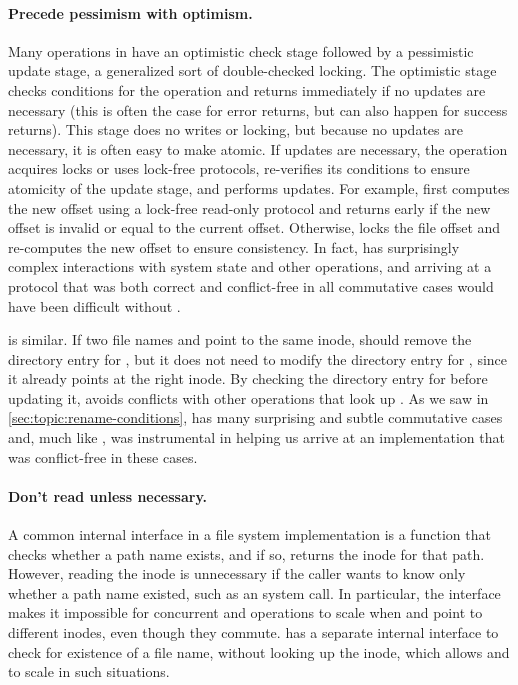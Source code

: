 \paragraph{Precede pessimism with optimism.} Many operations
in \fs have an optimistic check stage followed by a pessimistic update
stage, a generalized sort of double-checked locking.  The optimistic
stage checks conditions for the operation and returns immediately if
no updates are necessary (this is often the case for error returns,
but can also happen for success returns).  This stage does no writes
or locking, but because no updates are necessary, it is often easy to
make atomic.  If updates are necessary, the operation acquires
locks or uses lock-free protocols, re-verifies its conditions to
ensure atomicity of the update stage, and performs updates.  For
example,  first computes the new offset using a lock-free
read-only protocol and returns early if the new offset is invalid or
equal to the current offset.  Otherwise,  locks the file
offset and re-computes the new offset to ensure consistency.
%
In fact,  has surprisingly complex interactions with
system state and other operations, and arriving at a protocol that was
both correct and conflict-free in all commutative cases would have
been difficult without \tool.

 is similar.  If two file names  and 
point to the
same inode,  should remove the directory entry for
, but it does not need to modify the directory entry for
, since
it already points at the right inode.  By checking the directory
entry for  before updating it,  avoids
conflicts with other operations that look up .
%
As we saw in \cref{sec:topic:rename-conditions},  has
many surprising and subtle commutative cases and, much like
, \tool was instrumental in helping us arrive at an
implementation that was conflict-free in these cases.


\paragraph{Don't read unless necessary.}  A common internal interface
in a file system implementation is a  function that
checks whether a path name exists, and if so, returns the inode for
that path.
%
However, reading the inode is unnecessary
if the caller wants to know only whether a path name existed, such as
an  system call.  In particular, the 
interface makes it impossible for concurrent 
and  operations to scale when  and 
point to different inodes, even though they commute.
\fs has a separate internal interface to check for existence of a
file name, without looking up the inode, which allows 
and  to scale in such situations.


